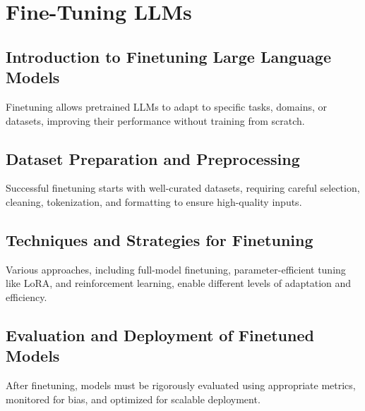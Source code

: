 \chapter{Fine-Tuning LLMs}

\section{Introduction to Finetuning Large Language Models}
Finetuning allows pretrained LLMs to adapt to specific tasks, domains, or datasets, improving their performance without training from scratch.

\section{Dataset Preparation and Preprocessing}
Successful finetuning starts with well-curated datasets, requiring careful selection, cleaning, tokenization, and formatting to ensure high-quality inputs.

\section{Techniques and Strategies for Finetuning}
Various approaches, including full-model finetuning, parameter-efficient tuning like LoRA, and reinforcement learning, enable different levels of adaptation and efficiency.

\section{Evaluation and Deployment of Finetuned Models}
After finetuning, models must be rigorously evaluated using appropriate metrics, monitored for bias, and optimized for scalable deployment.

